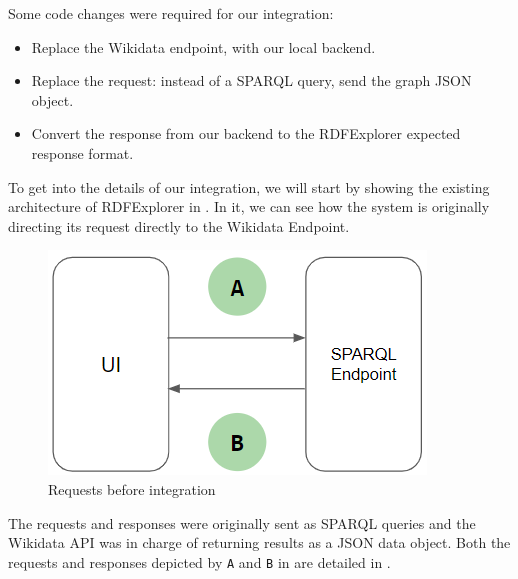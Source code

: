 Some code changes were required for our integration: 
\begin{itemize}
    \item Replace the Wikidata endpoint, with our local backend.
    \item Replace the request: instead of a SPARQL query, send the graph JSON object.
    \item Convert the response from our backend to the RDFExplorer expected response format.
\end{itemize} 

To get into the details of our integration, we will start by showing the existing architecture of RDFExplorer in . In it, we can see how the system is originally directing its request directly to the Wikidata Endpoint. 

\begin{figure}[h]
    \centering
        \includegraphics[width=0.4\linewidth]{imagenes/uiBeforeRequest.png}
        \caption{Requests before integration}
        \label{fig:uiBeforeRequests}
\end{figure}

The requests and responses were originally sent as SPARQL queries and the Wikidata API was in charge of returning results as a JSON data object. Both the requests and responses depicted by \texttt{A} and \texttt{B} in  are detailed in .

